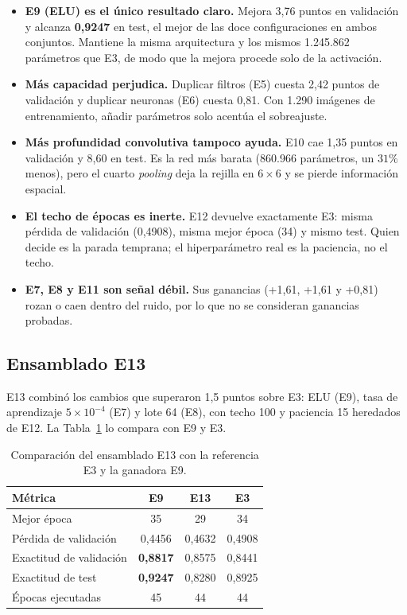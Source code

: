 \documentclass[11pt,a4paper]{article}
\begin{document}
\begin{itemize}
  \item \textbf{E9 (ELU) es el único resultado claro.} Mejora 3,76 puntos en validación y alcanza \textbf{0,9247} en test, el mejor de las doce configuraciones en ambos conjuntos. Mantiene la misma arquitectura y los mismos 1.245.862 parámetros que E3, de modo que la mejora procede solo de la activación.
  \item \textbf{Más capacidad perjudica.} Duplicar filtros (E5) cuesta 2,42 puntos de validación y duplicar neuronas (E6) cuesta 0,81. Con 1.290 imágenes de entrenamiento, añadir parámetros solo acentúa el sobreajuste.
  \item \textbf{Más profundidad convolutiva tampoco ayuda.} E10 cae 1,35 puntos en validación y 8,60 en test. Es la red más barata (860.966 parámetros, un $31\%$ menos), pero el cuarto \emph{pooling} deja la rejilla en $6\times6$ y se pierde información espacial.
  \item \textbf{El techo de épocas es inerte.} E12 devuelve exactamente E3: misma pérdida de validación (0,4908), misma mejor época (34) y mismo test. Quien decide es la parada temprana; el hiperparámetro real es la paciencia, no el techo.
  \item \textbf{E7, E8 y E11 son señal débil.} Sus ganancias (+1,61, +1,61 y +0,81) rozan o caen dentro del ruido, por lo que no se consideran ganancias probadas.
\end{itemize}

\subsection{Ensamblado E13}

E13 combinó los cambios que superaron 1,5 puntos sobre E3: ELU (E9), tasa de aprendizaje $5\times10^{-4}$ (E7) y lote 64 (E8), con techo 100 y paciencia 15 heredados de E12. La Tabla~\ref{tab:e13} lo compara con E9 y E3.

\begin{table}[htbp]
\centering
\small
\caption{Comparación del ensamblado E13 con la referencia E3 y la ganadora E9.}
\label{tab:e13}
\begin{tabular}{lccc}
\toprule
Métrica & E9 & E13 & E3 \\
\midrule
Mejor época & 35 & 29 & 34 \\
Pérdida de validación & 0,4456 & 0,4632 & 0,4908 \\
Exactitud de validación & \textbf{0,8817} & 0,8575 & 0,8441 \\
Exactitud de test & \textbf{0,9247} & 0,8280 & 0,8925 \\
Épocas ejecutadas & 45 & 44 & 44 \\
\bottomrule
\end{tabular}
\end{table}
\end{document}
